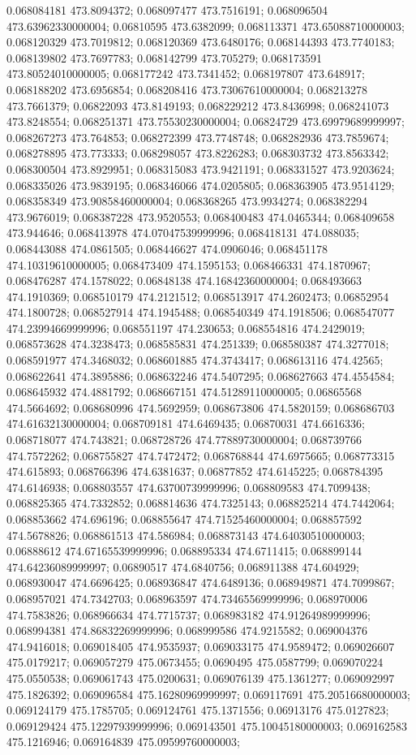 0.068084181 473.8094372; 0.068097477 473.7516191; 0.068096504 473.63962330000004; 0.06810595 473.6382099; 0.068113371 473.65088710000003; 0.068120329 473.7019812; 0.068120369 473.6480176; 0.068144393 473.7740183; 0.068139802 473.7697783; 0.068142799 473.705279; 0.068173591 473.80524010000005; 0.068177242 473.7341452; 0.068197807 473.648917; 0.068188202 473.6956854; 0.068208416 473.73067610000004; 0.068213278 473.7661379; 0.06822093 473.8149193; 0.068229212 473.8436998; 0.068241073 473.8248554; 0.068251371 473.75530230000004; 0.06824729 473.69979689999997; 0.068267273 473.764853; 0.068272399 473.7748748; 0.068282936 473.7859674; 0.068278895 473.773333; 0.068298057 473.8226283; 0.068303732 473.8563342; 0.068300504 473.8929951; 0.068315083 473.9421191; 0.068331527 473.9203624; 0.068335026 473.9839195; 0.068346066 474.0205805; 0.068363905 473.9514129; 0.068358349 473.90858460000004; 0.068368265 473.9934274; 0.068382294 473.9676019; 0.068387228 473.9520553; 0.068400483 474.0465344; 0.068409658 473.944646; 0.068413978 474.07047539999996; 0.068418131 474.088035; 0.068443088 474.0861505; 0.068446627 474.0906046; 0.068451178 474.10319610000005; 0.068473409 474.1595153; 0.068466331 474.1870967; 0.068476287 474.1578022; 0.06848138 474.16842360000004; 0.068493663 474.1910369; 0.068510179 474.2121512; 0.068513917 474.2602473; 0.06852954 474.1800728; 0.068527914 474.1945488; 0.068540349 474.1918506; 0.068547077 474.23994669999996; 0.068551197 474.230653; 0.068554816 474.2429019; 0.068573628 474.3238473; 0.068585831 474.251339; 0.068580387 474.3277018; 0.068591977 474.3468032; 0.068601885 474.3743417; 0.068613116 474.42565; 0.068622641 474.3895886; 0.068632246 474.5407295; 0.068627663 474.4554584; 0.068645932 474.4881792; 0.068667151 474.51289110000005; 0.06865568 474.5664692; 0.068680996 474.5692959; 0.068673806 474.5820159; 0.068686703 474.61632130000004; 0.068709181 474.6469435; 0.06870031 474.6616336; 0.068718077 474.743821; 0.068728726 474.77889730000004; 0.068739766 474.7572262; 0.068755827 474.7472472; 0.068768844 474.6975665; 0.068773315 474.615893; 0.068766396 474.6381637; 0.06877852 474.6145225; 0.068784395 474.6146938; 0.068803557 474.63700739999996; 0.068809583 474.7099438; 0.068825365 474.7332852; 0.068814636 474.7325143; 0.068825214 474.7442064; 0.068853662 474.696196; 0.068855647 474.71525460000004; 0.068857592 474.5678826; 0.068861513 474.586984; 0.068873143 474.64030510000003; 0.06888612 474.67165539999996; 0.068895334 474.6711415; 0.068899144 474.64236089999997; 0.06890517 474.6840756; 0.068911388 474.604929; 0.068930047 474.6696425; 0.068936847 474.6489136; 0.068949871 474.7099867; 0.068957021 474.7342703; 0.068963597 474.73465569999996; 0.068970006 474.7583826; 0.068966634 474.7715737; 0.068983182 474.91264989999996; 0.068994381 474.86832269999996; 0.068999586 474.9215582; 0.069004376 474.9416018; 0.069018405 474.9535937; 0.069033175 474.9589472; 0.069026607 475.0179217; 0.069057279 475.0673455; 0.0690495 475.0587799; 0.069070224 475.0550538; 0.069061743 475.0200631; 0.069076139 475.1361277; 0.069092997 475.1826392; 0.069096584 475.16280969999997; 0.069117691 475.20516680000003; 0.069124179 475.1785705; 0.069124761 475.1371556; 0.06913176 475.0127823; 0.069129424 475.12297939999996; 0.069143501 475.10045180000003; 0.069162583 475.1216946; 0.069164839 475.09599760000003; 